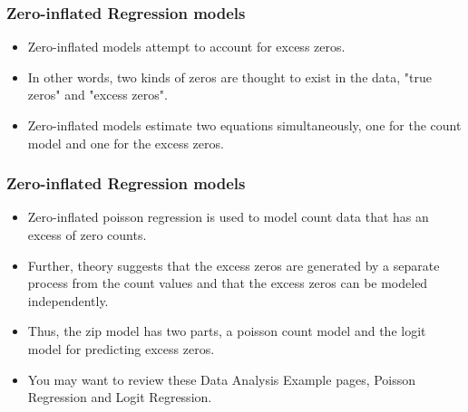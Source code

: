 \documentclass[MASTER.tex]{subfiles}
\begin{document}
\begin{frame}[fragile]
	\frametitle{Zero-inflated Regression models}
	\Large

	\begin{itemize}
		\item Zero-inflated models attempt to account for excess zeros. 
		\item In other words, two kinds of zeros are thought to exist in the data, "true zeros" and "excess zeros". 
		\item Zero-inflated models estimate two equations simultaneously, one for the count model and one for the excess zeros.
	\end{itemize}
\end{frame}

\begin{frame}[fragile]
	\frametitle{Zero-inflated Regression models}
	\Large
	\begin{itemize}
\item Zero-inflated poisson regression is used to model count data that has an excess of zero counts. 
\item Further, theory suggests that the excess zeros are generated by a separate process from the count values and that the excess zeros can be modeled independently. 
\item Thus, the zip model has two parts, a poisson count model and the logit model for predicting excess zeros.
\item You may want to review these Data Analysis Example pages, Poisson Regression and Logit Regression.
	\end{itemize}
\end{frame}
\end{document}
